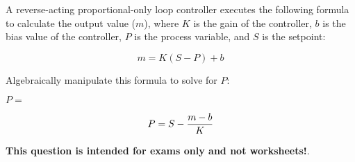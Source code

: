 

A reverse-acting proportional-only loop controller executes the following formula to calculate the output value ($m$), where $K$ is the gain of the controller, $b$ is the bias value of the controller, $P$ is the process variable, and $S$ is the setpoint:

$$m = K(S - P) + b$$

Algebraically manipulate this formula to solve for $P$:

\vskip 20pt

$P = $







$$P = S - {m - b \over K}$$







{\bf This question is intended for exams only and not worksheets!}.



